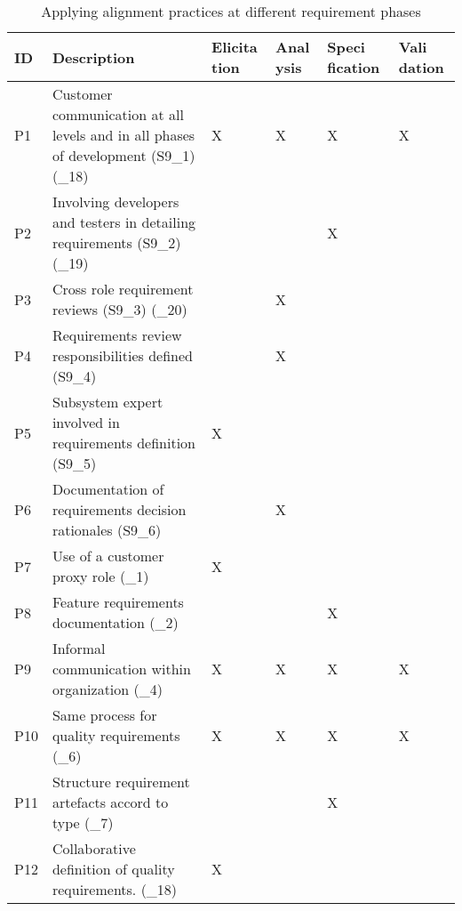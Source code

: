 \documentclass{article}
\begin{document}
\begin{table}
    \centering
    \begin{tabular}{|p{1cm}|p{5cm}|p{1cm}|p{1cm}|p{1cm}|p{1cm}|}
    \hline
         ID & Description & Elicita tion & Anal ysis & Speci fication & Vali dation \\
            \hline
         P1 & Customer communication at all levels and in all phases of development (S9\_1)  (\cite{bjarnason2014alignment}\_18) & X & X & X & X \\
          \hline
         P2 & Involving developers and testers in detailing requirements (S9\_2) (\cite{bjarnason2014alignment}\_19) & & & X & \\
          \hline
        P3 & Cross role requirement reviews (S9\_3)  (\cite{bjarnason2014alignment}\_20) &  & X & &  \\
         \hline
        P4 & Requirements review responsibilities defined (S9\_4) & & X & &  \\
         \hline
        P5 & Subsystem expert involved in requirements definition (S9\_5) & X & & &  \\
         \hline
        P6 & Documentation of requirements decision rationales (S9\_6) &   & X & & \\
         \hline
         P7 & Use of a customer proxy role (\cite{bjarnason2014alignment}\_1) & X &  & &  \\ \hline 
         P8 & Feature requirements documentation (\cite{bjarnason2014alignment}\_2) &  & & X &     \\ \hline
         P9 & Informal communication within organization (\cite{bjarnason2014alignment}\_4) & X & X & X & X \\ \hline
         P10 & Same process for quality requirements (\cite{bjarnason2014alignment}\_6) & X & X & X & X \\ \hline
         P11 & Structure requirement artefacts accord to type (\cite{bjarnason2014alignment}\_7) &  & & X & \\ \hline
         P12 & Collaborative definition of quality requirements. (\cite{bjarnason2014alignment}\_18) & X & & &  \\ \hline
    \end{tabular} 
    \caption{Applying alignment practices at different requirement phases}
    \label{tab:RePractices}
\end{table}
\end{document}
